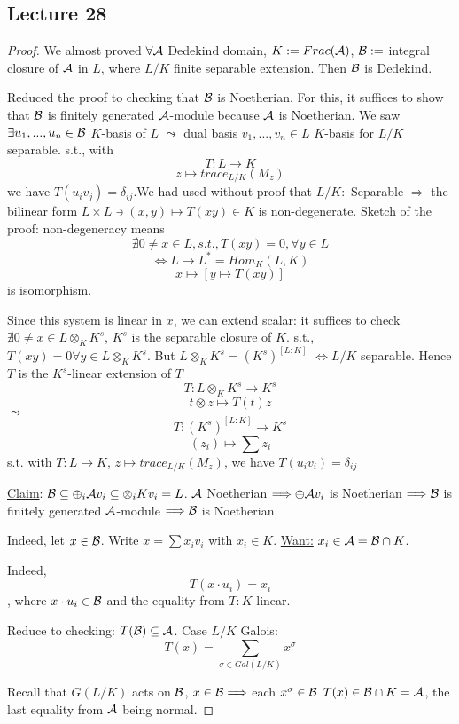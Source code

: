 \documentclass[11pt]{article}
\newcommand{\cala}{{\cal A}}
\newcommand{\calb}{{\cal B}}
\newcommand{\Lrta}{\Longrightarrow}
\newcommand{\lrta}{\longrightarrow}
\newcommand{\Llrta}{\Longleftrightarrow}
\begin{document}
\subsection{Lecture 28}
\begin{proof}
We almost proved
$\forall \cala$ Dedekind domain, $K:=Frac(\cala)$, $\calb:=$ integral closure of $\cala$ in $L$, where $L/K$ finite separable extension. Then $\calb$ is Dedekind.

Reduced the proof to checking that $\calb$ is Noetherian. For this, it suffices to show that $\calb$ is finitely generated $\cala$-module because $\cala$ is Noetherian. We saw $\exists u_1,...,u_n\in\calb$ $K$-basis of $L$ $\leadsto$ dual basis $v_1,...,v_n\in L$ $K$-basis for $L/K$ separable. s.t., with
 $$T:L\lrta K$$
$$z\longmapsto trace_{L/K}(M_z)$$
we have $T(u_iv_j)=\delta_{ij}$.We had used without proof that $L/K:$ Separable $\Lrta $ the bilinear form $L\times L\ni (x,y)\longmapsto T(xy)\in K$ is non-degenerate. Sketch of the proof: non-degeneracy means 
$$
\nexists 0\neq x\in L, s.t., T(xy)=0,\forall y\in L
$$
$$
\Llrta L \lrta L^*=Hom_{K}(L,K)
$$
$$
x\longmapsto [y\mapsto T(xy)] 
$$
is isomorphism.

Since this system is linear in $x$, we can extend scalar: it suffices to check $\nexists 0\neq x\in L\otimes_K K^s$, $K^s$ is the separable closure of $K$. s.t., $T(xy)=0\forall y\in L\otimes_K K^s$. But $L\otimes_K K^s=(K^s)^{[L:K]}$ $\Llrta L/K$ separable. Hence $T$ is the $K^s$-linear extension of $T$
$$
T:L\otimes_K K^s\lrta K^s
$$
$$
t\otimes z\longmapsto T(t)z
$$
$\leadsto$
$$
T:(K^s)^{[L:K]}\lrta K^s
$$
$$
(z_i)\longmapsto \sum z_i
$$
s.t.  with $T:L\lrta K$, $z\longmapsto trace_{L/K}(M_z)$, we have $T(u_i v_i)=\delta_{ij}$

\underline{Claim}: $\calb\subseteq \oplus_i \cala v_i\subseteq \otimes_i K v_i=L$. $\cala$ Noetherian $\Lrta \oplus \cala v_i$ is Noetherian $\Lrta \calb$ is finitely generated $\cala$-module $\Lrta \calb$ is Noetherian.

Indeed, let $x\in \calb$. Write $x=\sum x_i v_i$ with $x_i\in K$. \underline{Want:} $x_i\in \cala=\calb\cap K$.

Indeed, 
$$
T(x\cdot u_i)=x_i
$$
, where $x\cdot u_i\in\calb$ and the equality from $T:K$-linear.

Reduce to checking: $T(\calb)\subseteq \cala$. Case $L/K$ Galois:
$$
T(x)=\sum_{\sigma\in Gal(L/K)
} x^\sigma
$$

Recall that $G(L/K) $ acts on $\calb$, $x\in \calb\Lrta $ each $x^\sigma\in \calb$ $T(x)\in\calb\cap K=\cala$, the last equality from $\cala$ being normal.


\end{proof}
\end{document}
